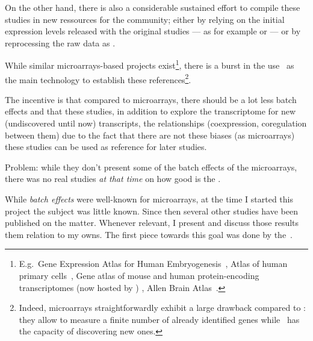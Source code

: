 On the other hand, there is also a considerable sustained effort
to compile these studies in new ressources for the community;
either by relying on the initial expression levels released with the original
studies --- as for example
 or
--- or
by reprocessing the raw data as
.

While similar microarrays-based projects exist\footnote{E.g.\ Gene Expression
Atlas for Human Embryogenesis~, Atlas of human primary
cells~, Gene atlas of mouse and human protein-encoding
transcriptomes (now hosted by ) ,
Allen Brain Atlas~.},
there is a burst in the use \Rnaseq\ as the main technology to establish
these references\footnote{Indeed, microarrays straightforwardly exhibit
a large drawback compared to \Rnaseq:
they allow to measure a finite number of already identified genes
while \Rnaseq\ has the capacity of discovering new ones.}.



The incentive is that compared to microarrays, there should be a lot less
batch effects and that these studies, in addition to explore the transcriptome
for new (undiscovered until now) transcripts, the relationships (coexpression,
coregulation between them) due to the fact that there are not these biases (as
microarrays) these studies can be used as reference for later studies.


Problem: while they don't present some of the batch effects of the microarrays,
there was no real studies \emph{at that time} on how good is the \Rnaseq.

While \emph{batch effects} were well-known for microarrays,
at the time I started this project
the subject was little known.
Since then several other studies have been published on the matter.
Whenever relevant, I present and discuss those results them relation to my owns.
The first piece towards this goal was done by the~.

\begin{comment}
Normal tissues sampled from various people are phenotypically very similar,
despite individual hereditary and environmental variations.
At molecular level,
technical noise, batch effects and physical limitations
are also generating variations.
\end{comment}


